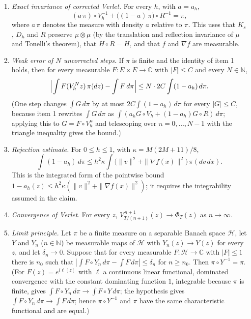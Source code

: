 \documentclass[11pt,a4paper]{article}
\begin{document}
\begin{enumerate}


\item \emph{Exact invariance of corrected Verlet.} For every \(h\), with \(a=a_h\),
\[(a\,\pi)\circ V_h^{-1}+\bigl((1-a)\,\pi\bigr)\circ R^{-1}=\pi,\]
where \(a\,\pi\) denotes the measure with density \(a\) relative to \(\pi\). This uses that \(K_s\), \(D_h\) and \(R\) preserve \(\mu\otimes\mu\) (by the translation and reflection invariance of \(\mu\) and Tonelli's theorem), that \(H\circ R=H\), and that \(f\) and \(\nabla f\) are measurable.

\item \emph{Weak error of \(N\) uncorrected steps.} If \(\pi\) is finite and the identity of item 1 holds, then for every measurable \(F:E\times E\to\mathbb C\) with \(|F|\le C\) and every \(N\in\mathbb N\),
\[\Bigl|\int F(V_h^Nz)\,\pi(dz)-\int F\,d\pi\Bigr|\le N\cdot2C\int(1-a_h)\,d\pi .\]
(One step changes \(\int G\,d\pi\) by at most \(2C\int(1-a_h)\,d\pi\) for every \(|G|\le C\), because item 1 rewrites \(\int G\,d\pi\) as \(\int(a_hG\circ V_h+(1-a_h)G\circ R)\,d\pi\); applying this to \(G=F\circ V_h^{n}\) and telescoping over \(n=0,\dots,N-1\) with the triangle inequality gives the bound.)

\item \emph{Rejection estimate.} For \(0\le h\le1\), with \(\kappa=M(2M+11)/8\),
\[\int(1-a_h)\,d\pi\le h^2\kappa\int\bigl(\|v\|^2+\|\nabla f(x)\|^2\bigr)\,\pi(dv\,dx).\]
This is the integrated form of the pointwise bound \(1-a_h(z)\le h^2\kappa(\|v\|^2+\|\nabla f(x)\|^2)\); it requires the integrability assumed in the claim.

\item \emph{Convergence of Verlet.} For every \(z\), \(V_{T/(n+1)}^{\,n+1}(z)\to\Phi_T(z)\) as \(n\to\infty\).

\item \emph{Limit principle.} Let \(\pi\) be a finite measure on a separable Banach space \(\mathcal H\), let \(Y\) and \(Y_n\) (\(n\in\mathbb N\)) be measurable maps of \(\mathcal H\) with \(Y_n(z)\to Y(z)\) for every \(z\), and let \(\delta_n\to0\). Suppose that for every measurable \(F:\mathcal H\to\mathbb C\) with \(|F|\le1\) there is \(n_0\) such that \(|\int F\circ Y_n\,d\pi-\int F\,d\pi|\le\delta_n\) for \(n\ge n_0\). Then \(\pi\circ Y^{-1}=\pi\). (For \(F(z)=e^{i\ell(z)}\) with \(\ell\) a continuous linear functional, dominated convergence with the constant dominating function \(1\), integrable because \(\pi\) is finite, gives \(\int F\circ Y_n\,d\pi\to\int F\circ Y\,d\pi\); the hypothesis gives \(\int F\circ Y_n\,d\pi\to\int F\,d\pi\); hence \(\pi\circ Y^{-1}\) and \(\pi\) have the same characteristic functional and are equal.)

\end{enumerate}
\end{document}
